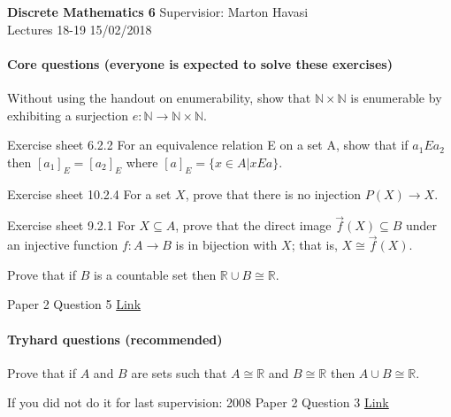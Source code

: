 \documentclass{exam}
\begin{document}
\noindent
\large\textbf{Discrete Mathematics 6} \hfill Supervisior: Marton Havasi \\
\normalsize Lectures 18-19 \hfill 15/02/2018

\paragraph{Core questions (everyone is expected to solve these exercises)}
\begin{questions}

\question Without using the handout on enumerability, show that $\mathbb{N}\times \mathbb{N}$ is enumerable by exhibiting a surjection $e: \mathbb{N} \rightarrow \mathbb{N}\times \mathbb{N}$.

\question Exercise sheet 6.2.2 For an equivalence relation E on a set A, show that if $a_1 E a_2$ then $[a_1]_E = [a_2]_E$  where $[a]_E = \{ x \in A | x E a \}$.

\question Exercise sheet 10.2.4 For a set $X$, prove that there is no injection $P(X) \rightarrow X$.

\question Exercise sheet 9.2.1 For $X \subseteq A$, prove that the direct image $\overrightarrow{f} (X) \subseteq B$ under an injective function $f : A \rightarrow B$ is in bijection
with $X$; that is, $X \cong \overrightarrow{f} (X)$.

\question Prove that if $B$ is a countable set then $\mathbb{R} \cup B \cong \mathbb{R}$.

 Paper 2 Question 5 \href{http://www.cl.cam.ac.uk/teaching/exams/pastpapers/y2006p2q5.pdf}{Link}

\end{questions}

\paragraph{Tryhard questions (recommended)}
\begin{questions}

\question Prove that if $A$ and $B$ are sets such that $A \cong \mathbb{R}$ and
$B \cong \mathbb{R}$ then $A \cup B \cong \mathbb{R}$.

\question If you did not do it for last supervision: 2008 Paper 2 Question 3 \href{http://www.cl.cam.ac.uk/teaching/exams/pastpapers/y2008p2q3.pdf}{Link} 


\end{questions}
\end{document}
